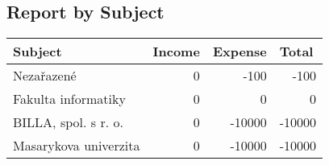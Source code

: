 \documentclass{article}
\begin{document}
        \subsection*{Report by Subject}
        \begin{tabular}{ | l | l | l | l | }
        \hline               

        \bfseries Subject &
        \bfseries Income &
        \bfseries Expense &
        \bfseries Total \\
        \hline
          
        Nezařazené &
            \multicolumn{1}{|r|}{0} &
            \multicolumn{1}{|r|}{-100} &
            \multicolumn{1}{|r|}{-100} \\
            \hline 
        Fakulta informatiky &
            \multicolumn{1}{|r|}{0} &
            \multicolumn{1}{|r|}{0} &
            \multicolumn{1}{|r|}{0} \\
            \hline 
        BILLA, spol. s r. o. &
            \multicolumn{1}{|r|}{0} &
            \multicolumn{1}{|r|}{-10000} &
            \multicolumn{1}{|r|}{-10000} \\
            \hline 
        Masarykova univerzita &
            \multicolumn{1}{|r|}{0} &
            \multicolumn{1}{|r|}{-10000} &
            \multicolumn{1}{|r|}{-10000} \\
            \hline 
        

        \hline  
        \end{tabular}

        
\end{document}
